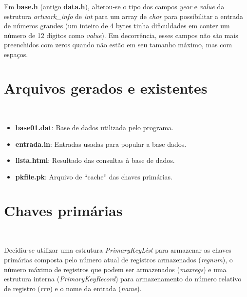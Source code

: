 \documentclass{article}
\begin{document}

Em \textbf{base.h} (antigo \textbf{data.h}), alterou-se o tipo dos campos \textit{year} e \textit{value} da estrutura \textit{artwork\_info} de \textit{int} para um array de \textit{char} para possibilitar a entrada de números grandes (um inteiro de 4 bytes tinha dificuldades em conter um número de 12 dígitos como \textit{value}). Em decorrência, esses campos não são mais preenchidos com zeros quando não estão em seu tamanho máximo, mas com espaços.

\section{Arquivos gerados e existentes}\

\begin{itemize}
 \item \textbf{base01.dat}: Base de dados utilizada pelo programa.
 \item \textbf{entrada.in}: Entradas usadas para popular a base dados.
 \item \textbf{lista.html}: Resultado das consultas à base de dados.
 \item \textbf{pkfile.pk}: Arquivo de ``cache'' das chaves primárias.
\end{itemize}

\section{Chaves primárias}\

Decidiu-se utilizar uma estrutura \textit{PrimaryKeyList} para armazenar as chaves primárias composta pelo número atual de registros armazenados (\textit{regnum}), o número máximo de registros que podem ser armazenados (\textit{maxregs}) e uma estrutura interna (\textit{PrimaryKeyRecord}) para armazenamento do número relativo de registro (\textit{rrn}) e o nome da entrada (\textit{name}).
\end{document}
